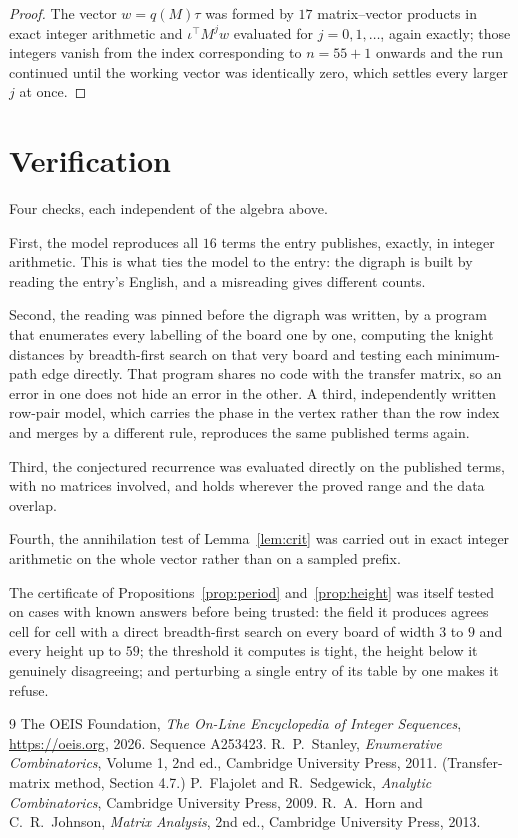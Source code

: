 \documentclass[11pt,a4paper]{article}
\theoremstyle{plain}
\theoremstyle{definition}
\begin{document}
\begin{proof}
The vector $w=q(M)\tau$ was formed by $17$ matrix--vector products in exact integer
arithmetic and $\iota^{\!\top}M^{j}w$ evaluated for $j=0,1,\dots$, again exactly; those
integers vanish from the index corresponding to $n=55+1$ onwards and the run continued
until the working vector was identically zero, which settles every larger $j$ at once.
\end{proof}

\section{Verification}

Four checks, each independent of the algebra above.

First, the model reproduces all $16$ terms the entry publishes, exactly, in integer
arithmetic. This is what ties the model to the entry: the digraph is built by reading the
entry's English, and a misreading gives different counts.

Second, the reading was pinned before the digraph was written, by a program that enumerates
every labelling of the board one by one, computing the knight distances by breadth-first
search on that very board and testing each minimum-path edge directly. That program shares no
code with the transfer matrix, so an error in one does not hide an error in the other. A
third, independently written row-pair model, which carries the phase in the vertex rather than
the row index and merges by a different rule, reproduces the same published terms again.

Third, the conjectured recurrence was evaluated directly on the published terms, with no
matrices involved, and holds wherever the proved range and the data overlap.

Fourth, the annihilation test of Lemma~\ref{lem:crit} was carried out in exact integer
arithmetic on the whole vector rather than on a sampled prefix.

The certificate of Propositions~\ref{prop:period} and~\ref{prop:height} was itself tested
on cases with known answers before being trusted: the field it produces agrees cell for cell
with a direct breadth-first search on every board of width $3$ to $9$ and every height up to
$59$; the threshold it computes is tight, the height below it genuinely disagreeing; and
perturbing a single entry of its table by one makes it refuse.

\begin{thebibliography}{9}
 The OEIS Foundation, \emph{The On-Line Encyclopedia of Integer
Sequences}, \url{https://oeis.org}, 2026. Sequence A253423.
 R.~P.~Stanley, \emph{Enumerative Combinatorics}, Volume 1, 2nd ed.,
Cambridge University Press, 2011. (Transfer-matrix method, Section 4.7.)
 P.~Flajolet and R.~Sedgewick, \emph{Analytic Combinatorics}, Cambridge
University Press, 2009.
 R.~A.~Horn and C.~R.~Johnson, \emph{Matrix Analysis}, 2nd ed., Cambridge
University Press, 2013.
\end{thebibliography}
\end{document}
